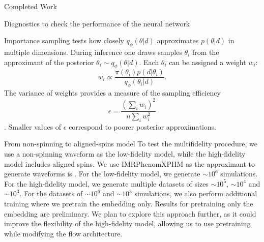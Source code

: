 \documentclass[a4paper, 12pt, twoside, openright, titlepage]{book}
\begin{document}
\begin{chapter}{Completed Work}
\begin{section}{Diagnostics to check the performance of the neural network}

Importance sampling tests how closely $q_{\phi}(\theta|d)$ approximates $p(\theta|d)$ in multiple dimensions.
During inference one draws samples $\theta_{i}$ from the approximant of the posterior $\theta_{i}\sim q_{\phi}(\theta|d)$.
Each $\theta_{i}$ can be assigned a weight $w_{i}$:
\begin{equation}
w_{i} \propto \frac{\pi(\theta_{i})p(d|\theta_{i})}{q_{\phi}(\theta_{i}|d)}.
\end{equation}
The variance of weights provides a measure of the sampling efficiency
\begin{equation}
\epsilon = \frac{\left(\sum_{i}w_{i}\right)^{2}}{n\sum_{i}w_{i}^{2}}
\end{equation}
\cite{2023PhRvL.130q1403D}.
Smaller values of $\epsilon$ correspond to poorer posterior approximations.


\end{section}


\begin{section}{From non-spinning to aligned-spins model}
To test the multifidelity procedure, we use a non-spinning waveform as the low-fidelity model, while the high-fidelity model includes aligned spins.
We use IMRPhenomXPHM as the approximant to generate waveforms is .
For the low-fidelity model, we generate $\sim 10^{6}$ simulations.
For the high-fidelity model, we generate multiple datasets of sizes $\sim 10^{5}$, $\sim 10^{4}$ and $\sim 10^{3}$.
For the datasets of $\sim10^{6}$ and $\sim10^{3}$ simulations, we also perform additional training where we pretrain the embedding only.
Results for pretraining only the embedding are preliminary.
We plan to explore this approach further, as it could improve the flexibility of the high-fidelity model, allowing us to use pretraining while modifying the flow architecture.


\end{section}
\end{chapter}
\end{document}

